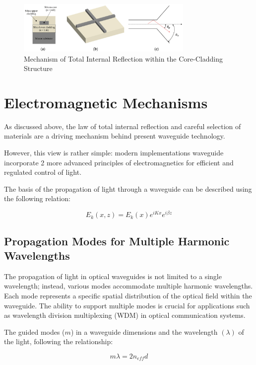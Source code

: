 \documentclass[10pt]{article}
\begin{document}
\begin{figure}[h]
    \centering
    \includegraphics[width=8.5cm]{Silicon-Waveguide.png}
    \caption{Mechanism of Total Internal Reflection within the Core-Cladding Structure} 
    \end{figure}

\section{Electromagnetic Mechanisms}

As discussed above, the law of total internal reflection and careful selection of materials are a driving mechanism behind present waveguide technology.

However, this view is rather simple: modern implementations waveguide incorporate 2 more advanced principles of electromagnetics for 
efficient and regulated control of light. 

The basis of the propagation of light through a waveguide can be described using the following relation:

\begin{equation}
    E_k(x, z) = E_k(x)e^{iKx}e^{i\beta z}
\end{equation}

\subsection{Propagation Modes for Multiple Harmonic Wavelengths}
The propagation of light in optical waveguides is not limited to a single wavelength; instead, various modes accommodate multiple harmonic wavelengths. Each mode represents a specific spatial distribution of the optical field within the waveguide. The ability to support multiple modes is crucial for applications such as wavelength division multiplexing (WDM) in optical communication systems.

The guided modes ($m$) in a waveguide dimensions and the wavelength $(\lambda)$ of the light, following the relationship:

\begin{equation}
    m\lambda = 2n_{eff}d
\end{equation}
\end{document}
